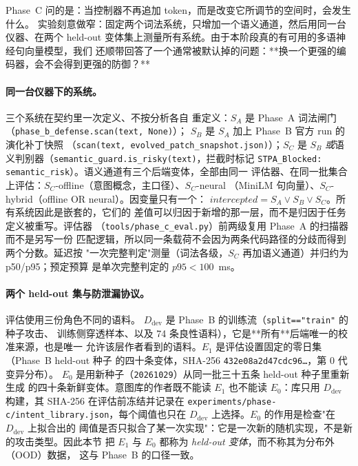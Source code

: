 Phase~C 问的是：当控制器不再追加 token，而是改变它所调节的空间时，会发生什么。
实验刻意做窄：固定两个词法系统，只增加一个语义通道，然后用同一台仪器、在两个
held-out 变体集上测量所有系统。由于本阶段真的有可用的多语神经句向量模型，我们
还顺带回答了一个通常被默认掉的问题：**换一个更强的编码器，会不会得到更强的防御？**

\paragraph{同一台仪器下的系统。} 三个系统在契约里一次定义、不按分析各自
重定义：$S_A$ 是 Phase~A 词法闸门（\texttt{phase\_b\_defense.scan(text, None)}）；
$S_B$ 是 $S_A$ 加上 Phase~B 官方 run 的演化补丁快照
（\texttt{scan(text, evolved\_patch\_snapshot.json)}）；$S_C$ 是 $S_B$
\emph{或}语义判别器（\texttt{semantic\_guard.is\_risky(text)}，拦截时标记
\texttt{STPA\_Blocked: semantic\_risk}）。语义通道有三个后端变体，全部由同一
评估器、在同一批集合上评估：$S_C$-offline（意图概念，主口径）、$S_C$-neural
（MiniLM 句向量）、$S_C$-hybrid（offline OR neural）。因变量只有一个：
$\mathit{intercepted} = S_A \lor S_B \lor S_C$。所有系统因此是嵌套的，它们的
差值可以归因于新增的那一层，而不是归因于任务定义被重写。评估器
（\texttt{tools/phase\_c\_eval.py}）前两级复用 Phase~A 的扫描器而不是另写一份
匹配逻辑，所以同一条载荷不会因为两条代码路径的分歧而得到两个分数。延迟按
"一次完整判定"测量（词法各级，$S_C$ 再加语义通道）并归约为 p50/p95；预定预算
是单次完整判定的 $p95 < 100$~ms。

\paragraph{两个 held-out 集与防泄漏协议。} 评估使用三份角色不同的语料。
$D_{\mathrm{dev}}$ 是 Phase~B 的训练流（\texttt{split=="train"} 的种子攻击、
训练侧穿透样本、以及 74 条良性语料），它是**所有**后端唯一的校准来源，也是唯一
允许该层作者看到的语料。$E_1$ 是评估设置固定的零日集（Phase~B held-out 种子
的四十条变体，SHA-256 \texttt{432e08a2d47cdc96\ldots}，第 0 代变异分布）。
$E_0$ 是用新种子（\texttt{20261029}）从同一批三十五条 held-out 种子里重新生成
的四十条新鲜变体。意图库的作者既不能读 $E_1$ 也不能读 $E_0$：库只用
$D_{\mathrm{dev}}$ 构建，其 SHA-256 在评估前冻结并记录在
\texttt{experiments/phase-c/intent\_library.json}，每个阈值也只在
$D_{\mathrm{dev}}$ 上选择。$E_0$ 的作用是检查"在 $D_{\mathrm{dev}}$ 上拟合出的
阈值是否只拟合了某一次实现"：它是一次新的随机实现，不是新的攻击类型。因此本节
把 $E_1$ 与 $E_0$ 都称为 \emph{held-out 变体}，而不称其为分布外（OOD）数据，
这与 Phase~B 的口径一致。

